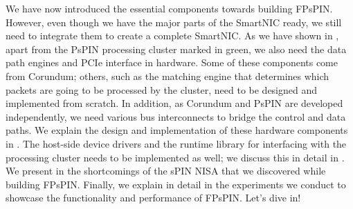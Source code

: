 We have now introduced the essential components towards building FPsPIN.  However, even though we have the major parts of the SmartNIC ready, we still need to integrate them to create a complete SmartNIC.  As we have shown in , apart from the PsPIN processing cluster marked in green, we also need the data path engines and PCIe interface in hardware.  Some of these components come from Corundum; others, such as the matching engine that determines which packets are going to be processed by the cluster, need to be designed and implemented from scratch.  In addition, as Corundum and PsPIN are developed independently, we need various bus interconnects to bridge the control and data paths.  We explain the design and implementation of these hardware components in .  The host-side device drivers and the runtime library for interfacing with the processing cluster needs to be implemented as well; we discuss this in detail in .  We present in  the shortcomings of the sPIN NISA that we discovered while building FPsPIN.  Finally, we explain in detail in  the experiments we conduct to showcase the functionality and performance of FPsPIN.  Let's dive in!
